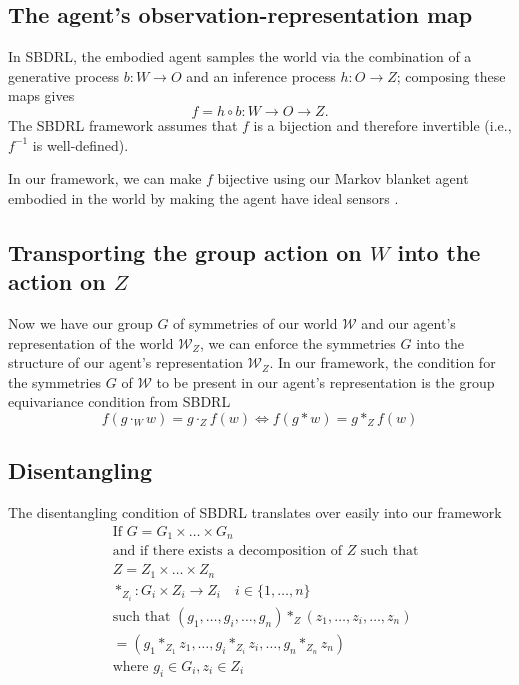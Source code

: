 \subsection{The agent's observation-representation map}

In SBDRL, the embodied agent 
samples the world via the combination of a generative process $b: W \to O$ and an inference process $h: O \to Z$; composing these maps gives
\begin{equation}
    f = h \circ b: W \to O \to Z.
\end{equation}
The SBDRL framework assumes that $f$ is a bijection and therefore invertible (i.e., $f^{-1}$ is well-defined).

In our framework, we can make $f$ bijective using our Markov blanket agent embodied in the world by making the agent have ideal sensors .

\subsection{Transporting the group action on $W$ into the action on $Z$}

Now we have our group $G$ of symmetries of our world $\mathscr{W}$ and our agent's representation of the world $\mathscr{W}_{Z}$, we can enforce the symmetries $G$ into the structure of our agent's representation $\mathscr{W}_{Z}$.
In our framework, the condition for the symmetries $G$ of $\mathscr{W}$ to be present in our agent's representation is the group equivariance condition from SBDRL
\begin{equation}
    f(g \cdot_{W} w) = g \cdot_{Z} f(w) \iff f(g \ast w) = g \ast_{Z} f(w)
\end{equation}

\subsection{Disentangling}
The disentangling condition of SBDRL translates over easily into our framework
\begin{align}
    &\text{If } G = G_{1} \times \dots \times G_{n} \\
    &\text{and if there exists a decomposition of $Z$ such that} \\
    &Z = Z_{1} \times \dots \times Z_{n} \\
    &*_{Z_{i}}: G_{i} \times Z_{i} \to Z_{i} \quad i \in \{1, \dots, n\} \\
    &\text{such that } (g_{1}, \dots, g_{i}, \dots, g_{n}) \ast_{Z} (z_{1}, \dots, z_{i}, \dots, z_{n}) \\
    &= (g_{1} \ast_{Z_{1}} z_{1}, \dots, g_{i} \ast_{Z_{i}} z_{i}, \dots, g_{n} \ast_{Z_{n}} z_{n} ) \\
    & \text{where } g_{i} \in G_{i}, z_{i} \in Z_{i}
\end{align}

